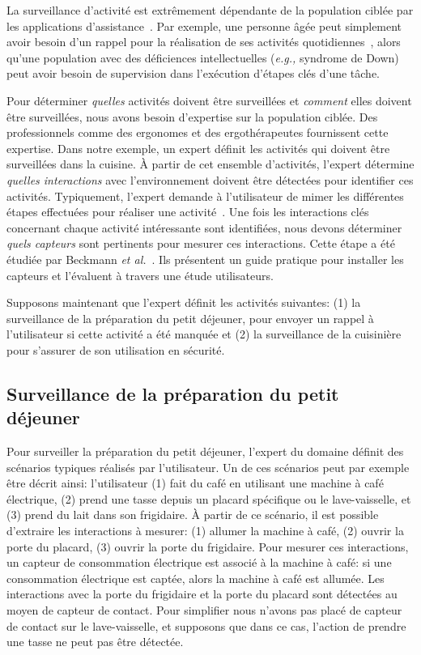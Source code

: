 La surveillance d'activité est extrêmement dépendante de la population ciblée par les applications d'assistance~\cite{DURICK-DISPELLING-OZCHI2013}. Par exemple, une personne âgée peut simplement avoir besoin d'un rappel pour la réalisation de ses activités quotidiennes~\cite{CAROUX-VERIFICATION-SIGACCESS2014}, alors qu'une population avec des déficiences intellectuelles ({\em e.g.,} syndrome de Down) peut avoir besoin de supervision dans l'exécution d'étapes clés d'une tâche\cite{LUSSIERDESROCHERS-ANALYSIS-DISABILITY2016}.

Pour déterminer {\em quelles} activités doivent être surveillées et {\em comment} elles doivent être surveillées, nous avons besoin d'expertise sur la population ciblée. Des professionnels comme des ergonomes et des ergothérapeutes fournissent cette expertise. Dans notre exemple, un expert définit les activités qui doivent être surveillées dans la cuisine. À partir de cet ensemble d'activités, l'expert détermine {\em quelles interactions} avec l'environnement doivent être détectées pour identifier ces activités. Typiquement, l'expert demande à l'utilisateur de mimer les différentes étapes effectuées pour réaliser une activité~\cite{CAROUX-VERIFICATION-SIGACCESS2014}. Une fois les interactions clés concernant chaque activité intéressante sont identifiées, nous devons déterminer {\em quels capteurs} sont pertinents pour mesurer ces interactions. Cette étape a été étudiée par Beckmann {\em et al.}~\cite{BECKMANN-SOME-UBICOMP2004}. Ils présentent un guide pratique pour installer les capteurs et l'évaluent à travers une étude utilisateurs.

Supposons maintenant que l'expert définit les activités suivantes: (1) la surveillance de la préparation du petit déjeuner, pour envoyer un rappel à l'utilisateur si cette activité a été manquée et (2) la surveillance de la cuisinière pour s'assurer de son utilisation en sécurité.

\subsection{Surveillance de la préparation du petit déjeuner}
Pour surveiller la préparation du petit déjeuner, l'expert du domaine définit des scénarios typiques réalisés par l'utilisateur. 
Un de ces scénarios peut par exemple être décrit ainsi: l'utilisateur (1) fait du café en utilisant une machine à café électrique, (2) prend une tasse depuis un placard spécifique ou le lave-vaisselle, et (3) prend du lait dans son frigidaire. 
À partir de ce scénario, il est possible d'extraire les interactions à mesurer: (1) allumer la machine à café, (2) ouvrir la porte du placard, (3) ouvrir la porte du frigidaire. Pour mesurer ces interactions, un capteur de consommation électrique est associé à la machine à café: si une consommation électrique est captée, alors la machine à café est allumée. Les interactions avec la porte du frigidaire et la porte du placard sont détectées au moyen de capteur de contact. Pour simplifier nous n'avons pas placé de capteur de contact sur le lave-vaisselle, et supposons que dans ce cas, l'action de prendre une tasse ne peut pas être détectée.


